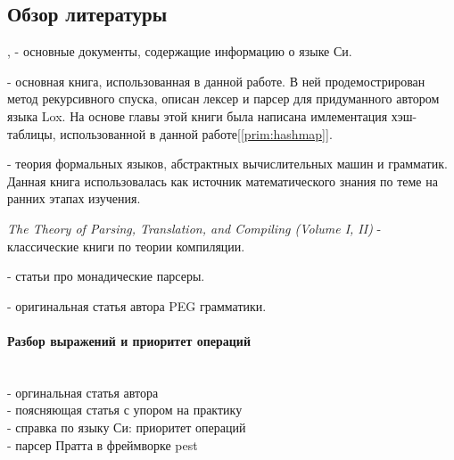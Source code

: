 \subsection*{Обзор литературы}

,  - основные документы, содержащие информацию о языке Си.

 - основная книга, использованная в данной работе. 
В ней продемострирован метод рекурсивного спуска, описан лексер и парсер для придуманного автором языка Lox.
На основе главы этой книги была написана имлементация хэш-таблицы, использованной в данной работе[\ref{prim:hashmap}].

 - теория формальных языков, абстрактных вычислительных машин и грамматик. 
Данная книга использовалась как источник математического знания по теме на ранних этапах изучения.

\textit{The Theory of Parsing, Translation, and Compiling (Volume I, II)}
\cite{ptc_vI} \cite{ptc_vII} - классические книги по теории компиляции.

 - статьи про монадические парсеры.

 - оригинальная статья автора PEG грамматики.

\paragraph{Разбор выражений и приоритет операций}
\label{litover:pratt} \mbox{} \\
 - оргинальная статья автора \\
 - поясняющая статья с упором на практику \\
 - справка по языку Си: приоритет операций \\
 - парсер Пратта в фреймворке pest





